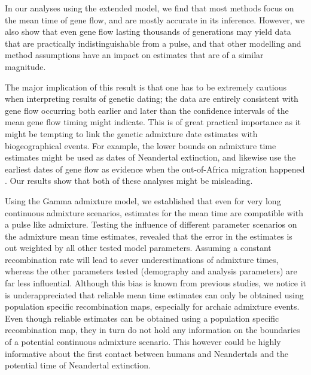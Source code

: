 \documentclass[]{article}
\begin{document}
In our analyses using the extended model, we find that most methods focus on the mean time of gene flow, and are mostly accurate in its inference. However, we also show that even gene flow lasting thousands of generations may yield data that are practically indistinguishable from a pulse, and that other modelling and method assumptions have an impact on estimates that are of a similar magnitude.

The major implication of this result is that one has to be extremely cautious when interpreting results of genetic dating; the data are entirely consistent with gene flow occurring both earlier and later than the confidence intervals of the mean gene flow timing might indicate. This is of great practical importance as it might be tempting to link the genetic admixture date estimates with biogeographical events. For example, the lower bounds on admixture time estimates might be used as dates of Neandertal extinction, and likewise use the earliest dates of gene flow as evidence when the out-of-Africa migration happened \citep{sankararaman_date_2012}. Our results show that both of these analyses might be misleading.




Using the Gamma admixture model, we established that even for very long continuous admixture scenarios, estimates for the mean time are compatible with a pulse like admixture. Testing the influence of different parameter scenarios on the admixture mean time estimates, revealed that the error in the estimates is out weighted by all other tested model parameters. Assuming a constant recombination rate will lead to sever underestimations of admixture times, whereas the other parameters tested (demography and analysis parameters) are far less influential. Although this bias is known from previous studies, we notice it is underappreciated that reliable mean time estimates can only be obtained using population specific recombination maps, especially for archaic admixture events. Even though reliable estimates can be obtained using a population specific recombination map, they in turn do not hold any information on the boundaries of a potential continuous admixture scenario. This however could be highly informative about the first contact between humans and Neandertals and the potential time of Neandertal extinction.
\end{document}

